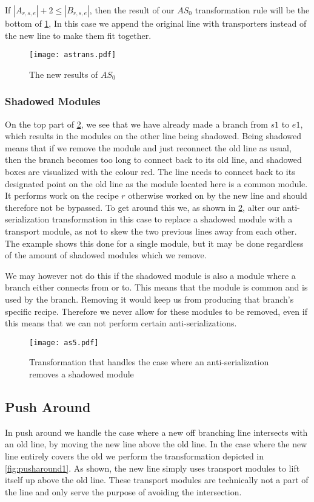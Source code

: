 If $|A_{r,s,e}| + 2 \leq |B_{r,s,e}|$,  then the result of our $AS_0$ transformation rule will be the bottom of \cref{fig:astrans}, In this case we append the original line with transporters instead of the new line to make them fit together.

\begin{figure}[H]
	\centering
	\texttt{[image: astrans.pdf]}
	\caption{The new results of $AS_0$}
	\label{fig:astrans}
\end{figure}

\subsubsection{Shadowed Modules}
On the top part of \cref{fig:shadowexample}, we see that we have already made a branch from $s1$ to $e1$, which results in the modules on the other line being shadowed. Being shadowed means that if we remove the module and just reconnect the old line as usual, then the branch becomes too long to connect back to its old line, and shadowed boxes are visualized with the colour red. The line needs to connect back to its designated point on the old line as the module located here is a common module. It performs work on the recipe $r$ otherwise worked on by the new line and should therefore not be bypassed.  To get around this we, as shown in \cref{fig:shadowexample}, alter our anti-serialization transformation in this case to replace a shadowed module with a transport module, as not to skew the two previous lines away from each other. The example shows this done for a single module, but it may be done regardless of the amount of shadowed modules which we remove.

We may however not do this if the shadowed module is also a module where a branch either connects from or to. This means that the module is common and is used by the branch. Removing it would keep us from producing that branch's specific recipe. Therefore we never allow for these modules to be removed, even if this means that we can not perform certain anti-serializations.

\begin{figure}[H]
	\centering
	\texttt{[image: as5.pdf]}
	\caption{Transformation that handles the case where an anti-serialization removes a shadowed module}
	\label{fig:shadowexample}
\end{figure}

\subsection{Push Around} \label{ssec:paround}
In push around we handle the case where a new off branching line intersects with an old line, by moving the new line above the old line. In the case where the new line entirely covers the old we perform the transformation depicted in \cref{fig:pusharound1}. As shown, the new line simply uses transport modules to lift itself up above the old line. These transport modules are technically not a part of the line and only serve the purpose of avoiding the intersection.

